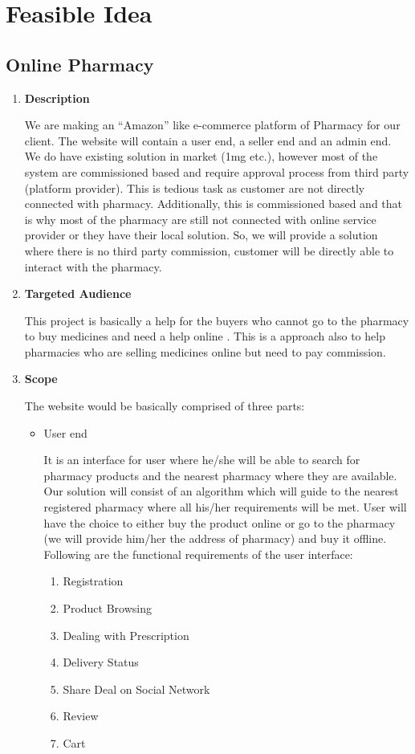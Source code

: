 \documentclass[fleqn,10pt]{../SelfArx} %
\begin{document}
\section{Feasible Idea}

\subsection{Online Pharmacy}

\vspace{0.5cm}
\begin{enumerate}
\item \textbf{Description}

We are making an “Amazon” like e-commerce platform of Pharmacy for our
client. The website will contain a user end, a seller end and an admin end. We
do have existing solution in market (1mg etc.), however most of the system are
commissioned based and require approval process from third party (platform
provider). This is tedious task as customer are not directly connected with
pharmacy. Additionally, this is commissioned based and that is why most of
the pharmacy are still not connected with online service provider or they have
their local solution. So, we will provide a solution where there is no third party
commission, customer will be directly able to interact with the pharmacy.
\item \textbf{Targeted Audience}

This project is basically a help for the buyers who cannot go to the pharmacy to buy medicines and need a help online . This is a approach also to help pharmacies who are selling medicines online but need to pay commission.

\item \textbf{Scope}

The website would be basically comprised of three parts:
\begin{itemize}
    \item User end
   
It is an interface for user where he/she will be able to search for pharmacy products and the nearest pharmacy where they are available. Our solution will consist of an algorithm which will guide to the nearest registered pharmacy where all his/her requirements will be met. User will have the choice to either buy the product online or go to the pharmacy (we will provide him/her the address of pharmacy) and buy it offline. Following are the functional requirements of the user interface:

\begin{enumerate}
    \item 
Registration 
 \item 	Product Browsing
 \item 	Dealing with Prescription
 \item 	Delivery Status 
 \item 	Share Deal on Social Network 
 \item 	Review 
 \item 	Cart
\end{enumerate}


\end{itemize}
\end{enumerate}
\end{document}
